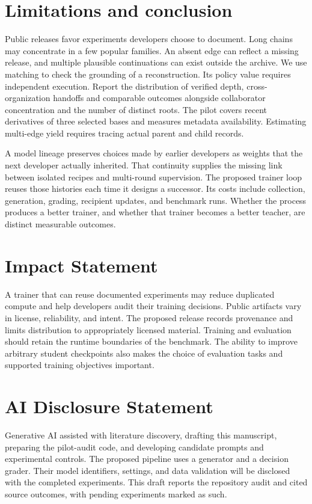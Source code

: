 \documentclass{article}
\begin{document}
\section{Limitations and conclusion}

Public releases favor experiments developers choose to document. Long chains may concentrate in a few popular families. An absent edge can reflect a missing release, and multiple plausible continuations can exist outside the archive. We use matching to check the grounding of a reconstruction. Its policy value requires independent execution. Report the distribution of verified depth, cross-organization handoffs and comparable outcomes alongside collaborator concentration and the number of distinct roots. The pilot covers recent derivatives of three selected bases and measures metadata availability. Estimating multi-edge yield requires tracing actual parent and child records.

A model lineage preserves choices made by earlier developers as weights that the next developer actually inherited. That continuity supplies the missing link between isolated recipes and multi-round supervision. The proposed trainer loop reuses those histories each time it designs a successor. Its costs include collection, generation, grading, recipient updates, and benchmark runs. Whether the process produces a better trainer, and whether that trainer becomes a better teacher, are distinct measurable outcomes.

\section*{Impact Statement}

A trainer that can reuse documented experiments may reduce duplicated compute and help developers audit their training decisions. Public artifacts vary in license, reliability, and intent. The proposed release records provenance and limits distribution to appropriately licensed material. Training and evaluation should retain the runtime boundaries of the benchmark. The ability to improve arbitrary student checkpoints also makes the choice of evaluation tasks and supported training objectives important.

\section*{AI Disclosure Statement}

Generative AI assisted with literature discovery, drafting this manuscript, preparing the pilot-audit code, and developing candidate prompts and experimental controls. The proposed pipeline uses a generator and a decision grader. Their model identifiers, settings, and data validation will be disclosed with the completed experiments. This draft reports the repository audit and cited source outcomes, with pending experiments marked as such.




\clearpage
\appendix
\onecolumn
\raggedbottom

\end{document}
